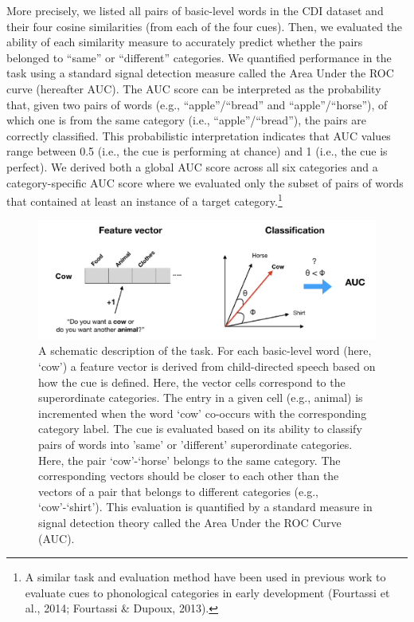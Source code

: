 \documentclass[english,,man]{apa6}
\let\rmarkdownfootnote\footnote%
\def\footnote{\protect\rmarkdownfootnote}
\begin{document}
More precisely, we listed all pairs of basic-level words in the CDI dataset and their four cosine similarities (from each of the four cues). Then, we evaluated the ability of each similarity measure to accurately predict whether the pairs belonged to \enquote{same} or \enquote{different} categories. We quantified performance in the task using a standard signal detection measure called the Area Under the ROC curve (hereafter AUC). The AUC score can be interpreted as the probability that, given two pairs of words (e.g., \enquote{apple}/\enquote{bread} and \enquote{apple}/\enquote{horse}), of which one is from the same category (i.e., \enquote{apple}/\enquote{bread}), the pairs are correctly classified. This probabilistic interpretation indicates that AUC values range between 0.5 (i.e., the cue is performing at chance) and 1 (i.e., the cue is perfect). We derived both a global AUC score across all six categories and a category-specific AUC score where we evaluated only the subset of pairs of words that contained at least an instance of a target category.\footnote{A similar task and evaluation method have been used in previous work to evaluate cues to phonological categories in early development (Fourtassi et al., 2014; Fourtassi \& Dupoux, 2013).}

\begin{figure}[h]

{\centering \includegraphics{child_language_journal_files/figure-latex/task-1} 

}

\caption{\label{fig:task} A schematic description of the task. For each basic-level word (here, `cow') a feature vector is derived from child-directed speech based on how the cue is defined. Here, the vector cells correspond to the superordinate categories. The entry in a given cell (e.g., animal) is incremented when the word `cow' co-occurs with the corresponding category label. The cue is evaluated based on its ability to classify pairs of words into 'same' or 'different' superordinate categories. Here, the pair `cow'-`horse' belongs to the same category. The corresponding vectors should be closer to each other than the vectors of a pair that belongs to different categories (e.g., `cow'-`shirt'). This evaluation is quantified by a standard measure in signal detection theory called the Area Under the ROC Curve (AUC).}\label{fig:task}
\end{figure}
\end{document}

